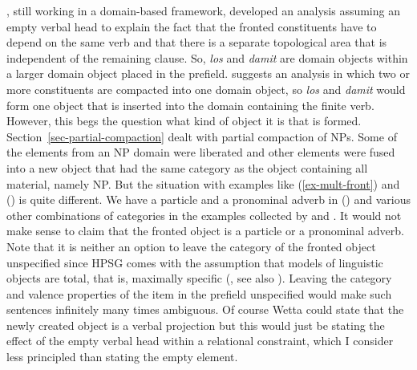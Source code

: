 \documentclass[output=paper]{langsci/langscibook}
\begin{document}
\citet{Mueller2002b}, still working in a domain-based framework, developed an analysis assuming an
empty verbal head to explain the fact that the fronted constituents have to depend on the same verb
and that there is a separate topological area that is independent of the remaining clause. So,
\emph{los} and \emph{damit} are domain objects within a larger domain object placed in the
prefield. \citet{Wetta2011a} suggests an analysis in which two or more constituents are compacted
into one domain object, so \emph{los} and \emph{damit} would form one object that is inserted into
the domain containing the finite verb. However, this begs the question what kind of object it is
that is formed. Section~\ref{sec-partial-compaction} dealt with partial compaction of NPs. Some of
the elements from an NP domain were liberated and other elements were fused into a new object that
had the same category as the object containing all material, namely NP. But the situation with examples like
(\ref{ex-mult-front}) and () is quite different. We have a particle and a pronominal adverb in () and various
other combinations of categories in the examples collected by \citet{Mueller2003b} and
\citet{Bildhauer2011a}. It would not make sense to claim that the fronted object is a particle or a
pronominal adverb. Note that it is neither an option to leave the category of the fronted object
unspecified since HPSG comes with the assumption that models of linguistic objects are total, that
is, maximally specific (\citealp{King99a-u}, see also ). Leaving the
category and valence properties of the item in the prefield unspecified would make such sentences
infinitely many times ambiguous. Of course Wetta could state that the newly created object is a
verbal projection but this would just be stating the effect of the empty verbal head within a
relational constraint, which I consider less principled than stating the empty element.
\end{document}
